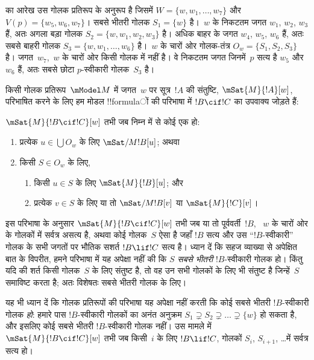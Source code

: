 \documentclass[../../../include/open-logic-section]{subfiles}
\begin{document}
 का आरेख उस गोलक प्रतिरूप के अनुरूप है जिसमें
$W = \{w, w_1, \dots, w_7\}$ और $V(p) = \{w_5, w_6, w_7\}$। सबसे भीतरी
गोलक $S_1 = \{w\}$ है।~$w$ के निकटतम जगत $w_1$, $w_2$, $w_3$ हैं, अतः
अगला बड़ा गोलक $S_2 = \{w, w_1, w_2, w_3\}$ है। अधिक बाहर के जगत $w_4$,
$w_5$, $w_6$ हैं, अतः सबसे बाहरी गोलक
$S_3 = \{w, w_1, \dots, w_6\}$ है।~$w$ के चारों ओर गोलक-तंत्र
$O_w = \{S_1, S_2, S_3\}$ है। जगत~$w_7$,~$w$ के चारों ओर किसी गोलक में
नहीं है। वे निकटतम जगत जिनमें~$p$ सत्य है $w_5$ और~$w_6$ हैं, अतः सबसे
छोटा $p$-स्वीकारी गोलक~$S_3$ है।

किसी गोलक प्रतिरूप~$\mModel M$ में जगत~$w$ पर सूत्र~$!A$ की संतुष्टि,
$\mSat{M}{!A}[w]$, परिभाषित करने के लिए हम मोडल !!{formula}ों की परिभाषा में
$!B \cif !C$ का उपवाक्य जोड़ते हैं:

\begin{defn}
  $\mSat{M}{!B \cif !C}[w]$ तभी जब निम्न में से कोई एक हो:
  \begin{enumerate}
  \item{} प्रत्येक $u \in \bigcup O_w$ के लिए
    $\mSat/{M}{!B}[u]$; अथवा
  \item{} किसी $S \in O_w$ के लिए,
    \begin{enumerate}
      \item किसी $u \in S$ के लिए $\mSat{M}{!B}[u]$; और
      \item प्रत्येक $v \in S$ के लिए या तो
        $\mSat/{M}{!B}[v]$ या $\mSat{M}{!C}[v]$।
    \end{enumerate}
  \end{enumerate}
\end{defn}

इस परिभाषा के अनुसार $\mSat{M}{!B \cif !C}[w]$ तभी जब या तो पूर्ववर्ती~$!B$,
~$w$ के चारों ओर के गोलकों में सर्वत्र असत्य है, अथवा कोई गोलक~$S$ ऐसा है
जहाँ $!B$ सत्य और उस ``$!B$-स्वीकारी'' गोलक के सभी जगतों पर भौतिक सशर्त
$!B \lif !C$ सत्य है। ध्यान दें कि सहज व्याख्या से अपेक्षित बात के विपरीत,
हमने परिभाषा में यह अपेक्षा नहीं की कि $S$ \emph{सबसे भीतरी} $!B$-स्वीकारी
गोलक हो। किंतु यदि  की शर्त किसी गोलक~$S$ के लिए
संतुष्ट है, तो वह उन सभी गोलकों के लिए भी संतुष्ट है जिन्हें~$S$ समाविष्ट
करता है; अतः विशेषतः सबसे भीतरी गोलक के लिए।

यह भी ध्यान दें कि गोलक प्रतिरूपों की परिभाषा यह अपेक्षा नहीं करती कि कोई
सबसे भीतरी $!B$-स्वीकारी गोलक \emph{हो}: हमारे पास $!B$-स्वीकारी गोलकों का
अनंत अनुक्रम $S_1 \supsetneq S_2 \supsetneq \dots \supsetneq \{w\}$ हो
सकता है, और इसलिए कोई सबसे भीतरी $!B$-स्वीकारी गोलक नहीं। उस मामले में
$\mSat{M}{!B \cif !C}[w]$ तभी जब किसी~$i$ के लिए $!B \lif !C$, गोलकों
$S_i$, $S_{i+1}$, \dots में सर्वत्र सत्य हो।
\end{document}
